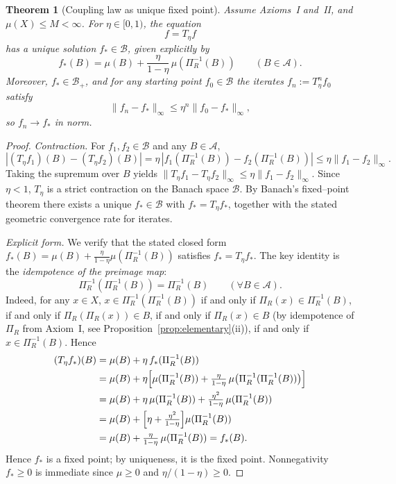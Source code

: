 \documentclass[11pt]{article}
\numberwithin{equation}{section}
\newtheorem{theorem}{Theorem}[section]
\theoremstyle{definition}
\begin{document}
\begin{theorem}[Coupling law as unique fixed point]\label{thm:coupling-fixed-point}
Assume Axioms~I and~II, and $\mu(X)\le M<\infty$. For $\eta\in[0,1)$, the equation
\[
f=T_\eta f
\]
has a unique solution $f_*\in\mathcal B$, given explicitly by
\[
f_*(B)=\mu(B)+\frac{\eta}{1-\eta}\,\mu(\Pi_R^{-1}(B))\qquad(B\in\mathcal A).
\]
Moreover, $f_*\in\mathcal B_+$, and for any starting point $f_0\in\mathcal B$ the iterates $f_n:=T_\eta^n f_0$ satisfy
\[
\|f_n-f_*\|_\infty\le\eta^n\|f_0-f_*\|_\infty,
\]
so $f_n\to f_*$ in norm.
\end{theorem}

\begin{proof}
\emph{Contraction.} For $f_1,f_2\in\mathcal B$ and any $B\in\mathcal A$,
\[
|(T_\eta f_1)(B)-(T_\eta f_2)(B)|=\eta\,|f_1(\Pi_R^{-1}(B))-f_2(\Pi_R^{-1}(B))|\le\eta\|f_1-f_2\|_\infty.
\]
Taking the supremum over $B$ yields $\|T_\eta f_1-T_\eta f_2\|_\infty\le\eta\|f_1-f_2\|_\infty$. Since $\eta<1$, $T_\eta$ is a strict contraction on the Banach space $\mathcal B$. By Banach's fixed--point theorem there exists a unique $f_*\in\mathcal B$ with $f_*=T_\eta f_*$, together with the stated geometric convergence rate for iterates.

\emph{Explicit form.} We verify that the stated closed form $f_*(B)=\mu(B)+\tfrac{\eta}{1-\eta}\mu(\Pi_R^{-1}(B))$ satisfies $f_*=T_\eta f_*$. The key identity is the \emph{idempotence of the preimage map}:
\[
\Pi_R^{-1}(\Pi_R^{-1}(B))=\Pi_R^{-1}(B)\qquad(\forall B\in\mathcal A).
\]
Indeed, for any $x\in X$, $x\in\Pi_R^{-1}(\Pi_R^{-1}(B))$ if and only if $\Pi_R(x)\in\Pi_R^{-1}(B)$, if and only if $\Pi_R(\Pi_R(x))\in B$, if and only if $\Pi_R(x)\in B$ (by idempotence of $\Pi_R$ from Axiom~I, see Proposition~\ref{prop:elementary}(ii)), if and only if $x\in\Pi_R^{-1}(B)$. Hence
\begin{align*}
(T_\eta f_*)(B)
&=\mu(B)+\eta\,f_*(\Pi_R^{-1}(B))\\
&=\mu(B)+\eta\Bigl[\mu(\Pi_R^{-1}(B))+\tfrac{\eta}{1-\eta}\,\mu\bigl(\Pi_R^{-1}(\Pi_R^{-1}(B))\bigr)\Bigr]\\
&=\mu(B)+\eta\,\mu(\Pi_R^{-1}(B))+\tfrac{\eta^2}{1-\eta}\,\mu(\Pi_R^{-1}(B))\\
&=\mu(B)+\Bigl[\eta+\tfrac{\eta^2}{1-\eta}\Bigr]\mu(\Pi_R^{-1}(B))\\
&=\mu(B)+\tfrac{\eta}{1-\eta}\,\mu(\Pi_R^{-1}(B))=f_*(B).
\end{align*}
Hence $f_*$ is a fixed point; by uniqueness, it is the fixed point. Nonnegativity $f_*\ge 0$ is immediate since $\mu\ge 0$ and $\eta/(1-\eta)\ge 0$.
\end{proof}
\end{document}
